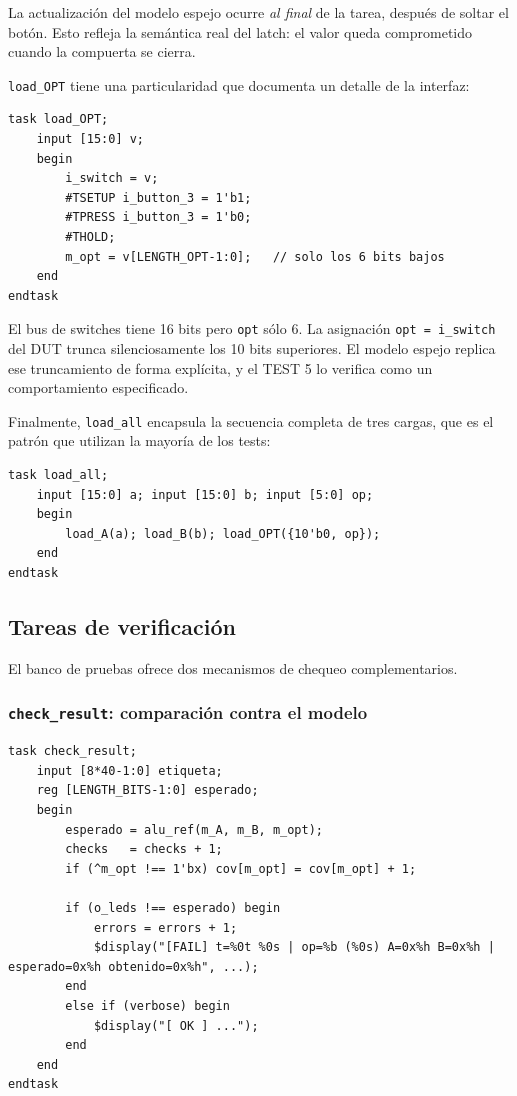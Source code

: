 \documentclass[12pt,a4paper]{article}
\begin{document}
La actualización del modelo espejo ocurre \emph{al final} de la tarea, después
de soltar el botón. Esto refleja la semántica real del latch: el valor queda
comprometido cuando la compuerta se cierra.

\texttt{load\_OPT} tiene una particularidad que documenta un detalle de la
interfaz:

\begin{lstlisting}[caption={Truncamiento del opcode en \texttt{load\_OPT}.}]
task load_OPT;
    input [15:0] v;
    begin
        i_switch = v;
        #TSETUP i_button_3 = 1'b1;
        #TPRESS i_button_3 = 1'b0;
        #THOLD;
        m_opt = v[LENGTH_OPT-1:0];   // solo los 6 bits bajos
    end
endtask
\end{lstlisting}

El bus de switches tiene 16 bits pero \texttt{opt} sólo 6. La asignación
\texttt{opt = i\_switch} del DUT trunca silenciosamente los 10 bits superiores.
El modelo espejo replica ese truncamiento de forma explícita, y el TEST 5 lo
verifica como un comportamiento especificado.

Finalmente, \texttt{load\_all} encapsula la secuencia completa de tres cargas,
que es el patrón que utilizan la mayoría de los tests:

\begin{lstlisting}[caption={Carga de los tres registros.}]
task load_all;
    input [15:0] a; input [15:0] b; input [5:0] op;
    begin
        load_A(a); load_B(b); load_OPT({10'b0, op});
    end
endtask
\end{lstlisting}

\subsection{Tareas de verificación}

El banco de pruebas ofrece dos mecanismos de chequeo complementarios.

\subsubsection{\texttt{check\_result}: comparación contra el modelo}

\begin{lstlisting}[caption={Chequeo contra el modelo de referencia.},label={lst:checkresult}]
task check_result;
    input [8*40-1:0] etiqueta;
    reg [LENGTH_BITS-1:0] esperado;
    begin
        esperado = alu_ref(m_A, m_B, m_opt);
        checks   = checks + 1;
        if (^m_opt !== 1'bx) cov[m_opt] = cov[m_opt] + 1;

        if (o_leds !== esperado) begin
            errors = errors + 1;
            $display("[FAIL] t=%0t %0s | op=%b (%0s) A=0x%h B=0x%h | esperado=0x%h obtenido=0x%h", ...);
        end
        else if (verbose) begin
            $display("[ OK ] ...");
        end
    end
endtask
\end{lstlisting}
\end{document}
